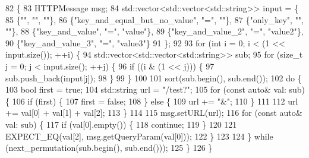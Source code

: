 \begin{DoxyCode}
82                                                \{
83   HTTPMessage msg;
84   std::vector<std::vector<std::string>> input = \{
85     \{\textcolor{stringliteral}{""}, \textcolor{stringliteral}{""}, \textcolor{stringliteral}{""}\},
86     \{\textcolor{stringliteral}{"key\_and\_equal\_but\_no\_value"}, \textcolor{stringliteral}{"="}, \textcolor{stringliteral}{""}\},
87     \{\textcolor{stringliteral}{"only\_key"}, \textcolor{stringliteral}{""}, \textcolor{stringliteral}{""}\},
88     \{\textcolor{stringliteral}{"key\_and\_value"}, \textcolor{stringliteral}{"="}, \textcolor{stringliteral}{"value"}\},
89     \{\textcolor{stringliteral}{"key\_and\_value\_2"}, \textcolor{stringliteral}{"="}, \textcolor{stringliteral}{"value2"}\},
90     \{\textcolor{stringliteral}{"key\_and\_value\_3"}, \textcolor{stringliteral}{"="}, \textcolor{stringliteral}{"value3"}\}
91   \};
92 
93   \textcolor{keywordflow}{for} (\textcolor{keywordtype}{int} i = 0; i < (1 << input.size()); ++i) \{
94     std::vector<std::vector<std::string>> sub;
95     \textcolor{keywordflow}{for} (\textcolor{keywordtype}{size\_t} j = 0; j < input.size(); ++j) \{
96       \textcolor{keywordflow}{if} ((i & (1 << j))) \{
97         sub.push\_back(input[j]);
98       \}
99     \}
100 
101     sort(sub.begin(), sub.end());
102     \textcolor{keywordflow}{do} \{
103       \textcolor{keywordtype}{bool} first = \textcolor{keyword}{true};
104       std::string url = \textcolor{stringliteral}{"/test?"};
105       \textcolor{keywordflow}{for} (\textcolor{keyword}{const} \textcolor{keyword}{auto}& val: sub) \{
106         \textcolor{keywordflow}{if} (first) \{
107           first = \textcolor{keyword}{false};
108         \} \textcolor{keywordflow}{else} \{
109           url += \textcolor{stringliteral}{"&"};
110         \}
111 
112         url += val[0] + val[1] + val[2];
113       \}
114 
115       msg.setURL(url);
116       \textcolor{keywordflow}{for} (\textcolor{keyword}{const} \textcolor{keyword}{auto}& val: sub) \{
117         \textcolor{keywordflow}{if} (val[0].empty()) \{
118           \textcolor{keywordflow}{continue};
119         \}
120 
121         EXPECT\_EQ(val[2], msg.getQueryParam(val[0]));
122       \}
123 
124     \} \textcolor{keywordflow}{while} (next\_permutation(sub.begin(), sub.end()));
125   \}
126 \}
\end{DoxyCode}
